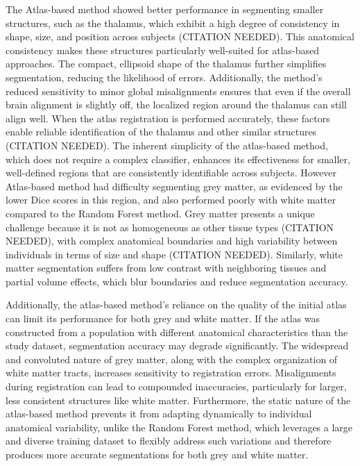 The Atlas-based method showed better performance in segmenting smaller structures, such as the thalamus, which exhibit a high degree of consistency in shape, size, and position across subjects (CITATION NEEDED). This anatomical consistency makes these structures particularly well-suited for atlas-based approaches. The compact, ellipsoid shape of the thalamus further simplifies segmentation, reducing the likelihood of errors. Additionally, the method’s reduced sensitivity to minor global misalignments ensures that even if the overall brain alignment is slightly off, the localized region around the thalamus can still align well. When the atlas registration is performed accurately, these factors enable reliable identification of the thalamus and other similar structures (CITATION NEEDED). The inherent simplicity of the atlas-based method, which does not require a complex classifier, enhances its effectiveness for smaller, well-defined regions that are consistently identifiable across subjects. However Atlas-based method had difficulty segmenting grey matter, as evidenced by the lower Dice scores in this region, and also performed poorly with white matter compared to the Random Forest method. Grey matter presents a unique challenge because it is not as homogeneous as other tissue types (CITATION NEEDED), with complex anatomical boundaries and high variability between individuals in terms of size and shape (CITATION NEEDED). Similarly, white matter segmentation suffers from low contrast with neighboring tissues and partial volume effects, which blur boundaries and reduce segmentation accuracy.

Additionally, the atlas-based method's reliance on the quality of the initial atlas can limit its performance for both grey and white matter. If the atlas was constructed from a population with different anatomical characteristics than the study dataset, segmentation accuracy may degrade significantly. The widespread and convoluted nature of grey matter, along with the complex organization of white matter tracts, increases sensitivity to registration errors. Misalignments during registration can lead to compounded inaccuracies, particularly for larger, less consistent structures like white matter. Furthermore, the static nature of the atlas-based method prevents it from adapting dynamically to individual anatomical variability, unlike the Random Forest method, which leverages a large and diverse training dataset to flexibly address such variations and therefore produces more accurate segmentations for both grey and white matter.

